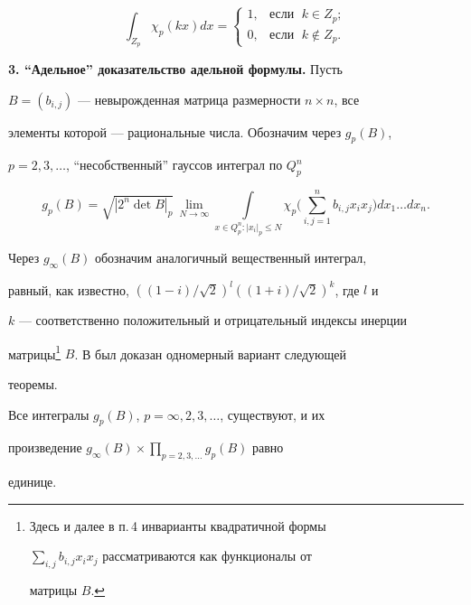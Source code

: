 \begin{equation} 


\int_{Z_p}\chi_p(k x)d x= 


\begin{cases} 


1, & \text{если }\; k\in Z_p;\\ 


0, & \text{если }\; k\notin Z_p. 


\end{cases} 


\end{equation} 


 


{\bf 3. ``Адельное'' доказательство адельной формулы.} Пусть 


$B=(b_{i,j})$ --- невырожденная матрица размерности $n\times n$, все 


элементы которой --- рациональные числа. Обозначим через $g_p(B)$, 


$p=2,3,\dotsc$, ``несобственный'' гауссов интеграл по $Q^n_p$ 


$$ 


g_p(B)=\sqrt{|2^n\det B|_p}\,\lim_{N\to\infty} 


\int\limits_{x\in Q^n_p:|x_i|_p\le N}\chi_p\bigg( 


\sum^n_{i,j=1}b_{i,j}x_i x_j\bigg)d x_1\dotsc d x_n. 


$$ 


Через $g_\infty(B)$ обозначим аналогичный вещественный интеграл, 


равный, как известно, $((1-i)/\sqrt{2})^l((1+i)/\sqrt{2})^k$, где $l$ и 


$k$ --- соответственно положительный и отрицательный индексы инерции 


матрицы\footnote{Здесь и далее в п.\,4 инварианты квадратичной формы 


$\sum\limits_{i,j}b_{i,j}x_i x_j$ рассматриваются как функционалы от 


матрицы $B$.} $B$. В \cite{1} был доказан одномерный вариант следующей 


теоремы. 


\addtocounter{footnote}{-1}


 


\begin{thm} 


Все интегралы $g_p(B)$, $p=\infty,2,3,\dotsc$, существуют, и их 


произведение $g_\infty(B)\times\prod\limits_{p=2,3,\dotsc}g_p(B)$ равно 


единице. 


\end{thm} 


